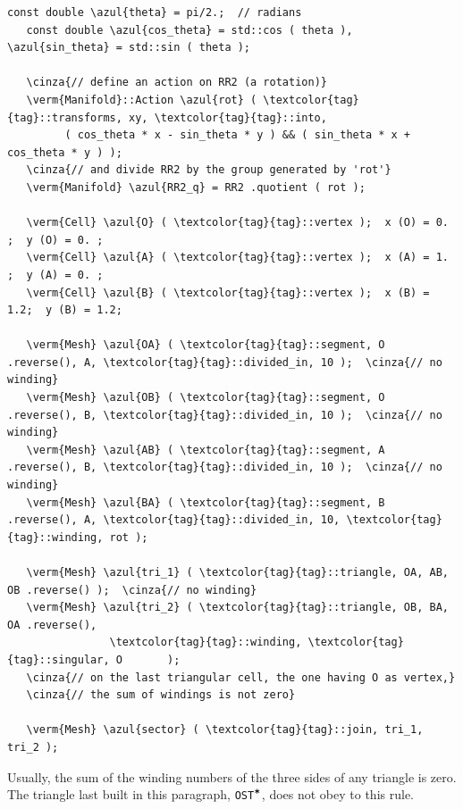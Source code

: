 \begin{Verbatim}[commandchars=\\\{\},formatcom=\small\tt,frame=single,
   label=parag-\ref{\numb section 7.\numb parag 12}.cpp,rulecolor=\color{coment},
   baselinestretch=0.94,framesep=2mm                                             ]
   const double \azul{theta} = pi/2.;  // radians
   const double \azul{cos_theta} = std::cos ( theta ), \azul{sin_theta} = std::sin ( theta );
	
   \cinza{// define an action on RR2 (a rotation)}
   \verm{Manifold}::Action \azul{rot} ( \textcolor{tag}{tag}::transforms, xy, \textcolor{tag}{tag}::into,
         ( cos_theta * x - sin_theta * y ) && ( sin_theta * x + cos_theta * y ) );
   \cinza{// and divide RR2 by the group generated by 'rot'}
   \verm{Manifold} \azul{RR2_q} = RR2 .quotient ( rot );

   \verm{Cell} \azul{O} ( \textcolor{tag}{tag}::vertex );  x (O) = 0. ;  y (O) = 0. ;
   \verm{Cell} \azul{A} ( \textcolor{tag}{tag}::vertex );  x (A) = 1. ;  y (A) = 0. ;
   \verm{Cell} \azul{B} ( \textcolor{tag}{tag}::vertex );  x (B) = 1.2;  y (B) = 1.2;

   \verm{Mesh} \azul{OA} ( \textcolor{tag}{tag}::segment, O .reverse(), A, \textcolor{tag}{tag}::divided_in, 10 );  \cinza{// no winding}
   \verm{Mesh} \azul{OB} ( \textcolor{tag}{tag}::segment, O .reverse(), B, \textcolor{tag}{tag}::divided_in, 10 );  \cinza{// no winding}
   \verm{Mesh} \azul{AB} ( \textcolor{tag}{tag}::segment, A .reverse(), B, \textcolor{tag}{tag}::divided_in, 10 );  \cinza{// no winding}
   \verm{Mesh} \azul{BA} ( \textcolor{tag}{tag}::segment, B .reverse(), A, \textcolor{tag}{tag}::divided_in, 10, \textcolor{tag}{tag}::winding, rot );

   \verm{Mesh} \azul{tri_1} ( \textcolor{tag}{tag}::triangle, OA, AB, OB .reverse() );  \cinza{// no winding}
   \verm{Mesh} \azul{tri_2} ( \textcolor{tag}{tag}::triangle, OB, BA, OA .reverse(),
                \textcolor{tag}{tag}::winding, \textcolor{tag}{tag}::singular, O       );
   \cinza{// on the last triangular cell, the one having O as vertex,}
   \cinza{// the sum of windings is not zero}

   \verm{Mesh} \azul{sector} ( \textcolor{tag}{tag}::join, tri_1, tri_2 );
\end{Verbatim}

Usually, the sum of the winding numbers of the three sides of any triangle is zero.
The triangle last built in this paragraph, {\small\tt OST$^{\mbox{\small\tt *}}$},
does not obey to this rule.


